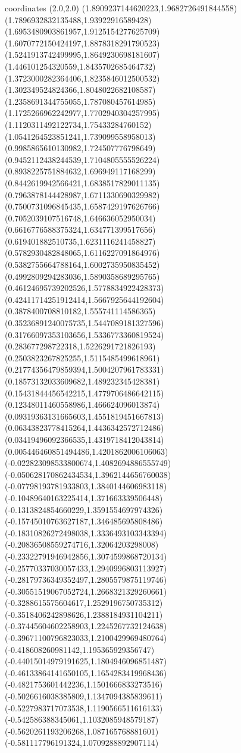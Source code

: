 coordinates {%
(2.0,2.0)
(1.8909237144620223,1.9682726491844558)
(1.7896932832135488,1.93922916589428)
(1.6953480903861957,1.9125154277625709)
(1.6070772150424197,1.8878318291790523)
(1.5241913742499995,1.8649230698181607)
(1.446101254320559,1.8435702685464732)
(1.3723000282364406,1.8235846012500532)
(1.302349524824366,1.8048022682108587)
(1.2358691344755055,1.787080457614985)
(1.1725266962242977,1.7702940304257995)
(1.1120311492122734,1.75433284760152)
(1.0541264523851241,1.739099558958013)
(0.9985865610130982,1.724507776798649)
(0.9452112438244539,1.7104805555526224)
(0.8938225751884632,1.696949117168299)
(0.8442619942566421,1.6838517829011135)
(0.7963878144428987,1.6711330690329982)
(0.7500731096845435,1.6587429197626766)
(0.7052039107516748,1.646636052950034)
(0.6616776588375324,1.634771399517656)
(0.619401882510735,1.6231116241458827)
(0.5782930482848065,1.6116227091864976)
(0.5382755664788164,1.6002735950835452)
(0.4992809294283036,1.5890358689295765)
(0.46124695739202526,1.5778834922428373)
(0.42411714251912414,1.5667925644192604)
(0.3878400708810182,1.555741114586365)
(0.35236891240075735,1.5447089181327596)
(0.31766097353103656,1.5336773360819524)
(0.283677298722318,1.5226291721826193)
(0.2503823267825255,1.5115485499618961)
(0.21774356479859394,1.5004207961783331)
(0.18573132033609682,1.489232345428381)
(0.15431844456542215,1.4779706486642115)
(0.12348011460558986,1.466624096013874)
(0.09319363131665603,1.4551819451667813)
(0.06343823778415264,1.4436342572712486)
(0.03419496092366535,1.4319718412043814)
(0.005446460851494486,1.4201862006106063)
(-0.022823098533800674,1.4082694886555749)
(-0.050628170862434534,1.3962144656760038)
(-0.07798193781933803,1.3840144606983118)
(-0.10489640163225414,1.371663339506448)
(-0.1313824854660229,1.3591554697974326)
(-0.15745010763627187,1.346485695808486)
(-0.18310826272498038,1.3336493103343394)
(-0.20836508559274716,1.32064203298008)
(-0.23322791946942856,1.3074599868720134)
(-0.25770337030057433,1.2940996803113927)
(-0.28179736349352497,1.2805579875119746)
(-0.30551519067052724,1.2668321329260661)
(-0.3288615575604617,1.2529196750735312)
(-0.3518406242898626,1.2388184931104211)
(-0.37445604602258903,1.2245267732124638)
(-0.39671100796823033,1.2100429969480764)
(-0.418608260981142,1.195365929356747)
(-0.44015014979191625,1.1804946096851487)
(-0.46133864141650105,1.1654283419968436)
(-0.4821753601442236,1.1501666833273516)
(-0.5026616038385809,1.1347094385839611)
(-0.5227983717073538,1.1190566511616133)
(-0.542586388345061,1.1032085948579187)
(-0.5620261193206268,1.087165768881601)
(-0.581117796191324,1.0709288892907114)
}
